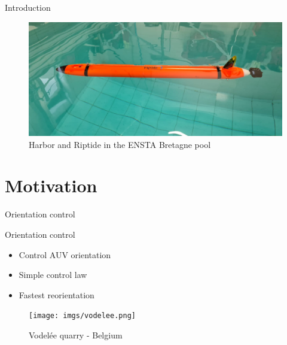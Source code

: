 \documentclass[10pt, xcolor={usenames, dvipsnames}]{beamer}
\begin{document}
\begin{frame}{Introduction}
\begin{minipage}[c]{0.4\textwidth}
\begin{figure}[htb]
                    \vspace{.1cm}

                    \includegraphics[width=\textwidth]{imgs/Riptide.jpeg}
                    \caption{Harbor and Riptide in the ENSTA Bretagne pool}
                \end{figure}
            \end{minipage}
        \end{frame}

    \section{Motivation}

        \begin{frame}{Orientation control}
            \begin{minipage}[c]{0.5\textwidth}
                \begin{block}{Orientation control}
                    \vspace{0.25cm}
                    \begin{itemize}
                        \item Control AUV orientation \\
                        \item Simple control law \\
                        \item Fastest reorientation
                    \end{itemize}
                \end{block}
            \end{minipage}
            \hfill
            \begin{minipage}[c]{0.46\textwidth}
                \begin{figure}
                    \centering
                    \texttt{[image: imgs/vodelee.png]}
                    \caption{Vodelée quarry - Belgium}
                \end{figure}
            \end{minipage}
        \end{frame}
\end{document}
